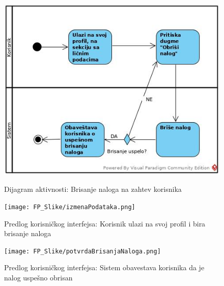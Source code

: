 \documentclass[20pt]{article}
\begin{document}
\begin{figure}[h]
        \centering
        \includegraphics[width=1.1\textwidth,height=0.57\textheight]{Pictures/BrisanjeNalogaNaZahtevKorisnika.jpg}\\
        \caption{Dijagram aktivnosti: Brisanje naloga na zahtev korisnika}
        \label{fig:dijagramAktivnostiBrisanjeKorisnik}
    \end{figure}
    

\newpage
\begin{figure}[h]
        \centering
        \texttt{[image: FP\_Slike/izmenaPodataka.png]}\\
        \caption{Predlog korisni\v ckog interfejsa: Korisnik ulazi na svoj profil i bira brisanje naloga}
    \end{figure}
    
\newpage
\begin{figure}[h]
        \centering
        \texttt{[image: FP\_Slike/potvrdaBrisanjaNaloga.png]}\\
        \caption{Predlog korisni\v ckog interfejsa: Sistem obavestava korisnika da je nalog uspe\v sno obrisan}
    \end{figure}
    

\newpage
\end{document}
